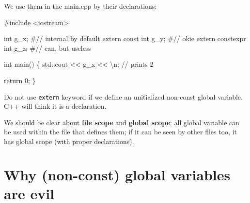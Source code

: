 \documentclass[
  letterpaper,
  DIV=11,
  numbers=noendperiod]{scrreprt}
\newenvironment{Shaded}{\begin{snugshade}}{\end{snugshade}}
\newcommand{\CommentTok}[1]{\textcolor[rgb]{0.37,0.37,0.37}{#1}}
\newcommand{\DecValTok}[1]{\textcolor[rgb]{0.68,0.00,0.00}{#1}}
\newcommand{\ErrorTok}[1]{\textcolor[rgb]{0.68,0.00,0.00}{#1}}
\newcommand{\FunctionTok}[1]{\textcolor[rgb]{0.28,0.35,0.67}{#1}}
\newcommand{\NormalTok}[1]{\textcolor[rgb]{0.00,0.23,0.31}{#1}}
\newcommand{\SpecialCharTok}[1]{\textcolor[rgb]{0.37,0.37,0.37}{#1}}
\newcommand{\StringTok}[1]{\textcolor[rgb]{0.13,0.47,0.30}{#1}}
\begin{document}
We use them in the main.cpp by their declarations:

\begin{Shaded}
\begin{Highlighting}[]
\CommentTok{\#include \textless{}iostream\textgreater{}}

\NormalTok{int g\_x;                   }\CommentTok{\#// internal by default}
\NormalTok{extern const int g\_y;     }\CommentTok{\#// okie}
\NormalTok{extern constexpr int g\_z;    }\CommentTok{\#// can, but useless}

\NormalTok{int }\FunctionTok{main}\NormalTok{()}
\NormalTok{\{}
\NormalTok{    std}\SpecialCharTok{::}\NormalTok{cout }\SpecialCharTok{\textless{}}\ErrorTok{\textless{}}\NormalTok{ g\_x }\SpecialCharTok{\textless{}}\ErrorTok{\textless{}} \StringTok{\textquotesingle{}}\SpecialCharTok{\textbackslash{}n}\StringTok{\textquotesingle{}}\NormalTok{; }\SpecialCharTok{/}\ErrorTok{/}\NormalTok{ prints }\DecValTok{2}

\NormalTok{    return }\DecValTok{0}\NormalTok{;}
\NormalTok{\}}
\end{Highlighting}
\end{Shaded}

\begin{tcolorbox}[enhanced jigsaw, toprule=.15mm, rightrule=.15mm, opacityback=0, breakable, leftrule=.75mm, colback=white, colframe=quarto-callout-warning-color-frame, arc=.35mm, left=2mm, bottomrule=.15mm]
\begin{minipage}[t]{5.5mm}
\textcolor{quarto-callout-warning-color}{\faExclamationTriangle}
\end{minipage}%
\begin{minipage}[t]{\textwidth - 5.5mm}

Do not use \texttt{extern} keyword if we define an unitialized non-const
global variable. C++ will think it is a declaration.

\end{minipage}%
\end{tcolorbox}

We should be clear about \textbf{file scope} and \textbf{global scope}:
all global variable can be used within the file that defines them; if it
can be seen by other files too, it has global scope (with proper
declarations).

\hypertarget{why-non-const-global-variables-are-evil}{%
\section{Why (non-const) global variables are
evil}\label{why-non-const-global-variables-are-evil}}
\end{document}
